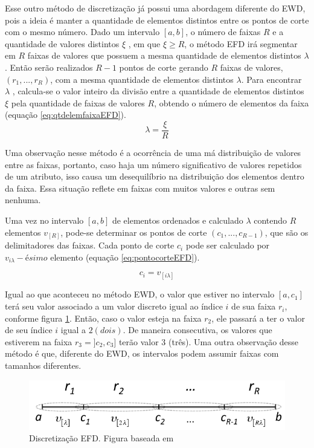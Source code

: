Esse outro método de discretização já possui uma abordagem diferente do EWD, pois a ideia é manter a quantidade de elementos distintos entre os pontos de corte com o mesmo número. Dado um intervalo ${[a,b]}$, o número de faixas ${R}$ e a quantidade de valores distintos ${\xi}$ , em que ${\xi \geqslant R}$, o método EFD irá segmentar em ${R}$ faixas de valores que possuem a mesma quantidade de elementos distintos ${\lambda}$. Então serão realizados ${R-1}$ pontos de corte gerando ${R}$ faixas de valores, ${(r_1,...,r_R)}$, com a mesma quantidade de elementos distintos ${\lambda}$. Para encontrar ${\lambda}$ , calcula-se o valor inteiro da divisão entre a quantidade de elementos distintos ${\xi}$ pela quantidade de faixas de valores ${R}$, obtendo o número de elementos da faixa (equação \ref{eq:qtdelemfaixaEFD}). 
\begin{equation}
\lambda = \frac{\xi}{R}
 \label{eq:qtdelemfaixaEFD}
\end{equation}

Uma observação nesse método é a ocorrência de uma má distribuição de valores entre as faixas, portanto, caso haja um número significativo de valores repetidos de um atributo, isso causa um desequilíbrio na distribuição dos elementos dentro da faixa. Essa situação reflete em faixas com muitos valores e outras sem nenhuma. 

Uma vez no intervalo ${[a,b]}$ de elementos ordenados e calculado ${\lambda}$ contendo ${R}$ elementos ${v_{[R]}}$,  pode-se determinar os pontos de corte ${(c_1,...,c_{R-1})}$, que são os delimitadores das faixas. Cada ponto de corte ${c_i}$ pode ser calculado por ${v_{i\lambda}-ésimo}$ elemento (equação \ref{eq:pontocorteEFD}).

\begin{equation}
c_i = v_{[i\lambda]}
 \label{eq:pontocorteEFD}
\end{equation}

Igual ao que aconteceu no método EWD, o valor que estiver no intervalo ${[a,c_1]}$ terá seu valor associado a um valor discreto igual ao índice ${i}$ de sua faixa ${r_i}$, conforme figura \ref{fig:faixasEFD}. Então, caso o valor esteja na faixa ${r_2}$, ele passará a ter o valor de seu índice ${i}$ igual a ${2(dois)}$. De maneira consecutiva, os valores que estiverem na faixa ${r_3=]c_2,c_3]}$ terão valor 3 (três). Uma outra observação desse método é que, diferente do EWD, os intervalos podem assumir faixas com tamanhos diferentes.

\begin{figure}[h]
        \centering
        \includegraphics[scale=0.6]{figs/discretizacaoEFD.png}
        \caption[Discretização EFD]{Discretização EFD. Figura baseada em \cite{Lopes2016}} 
        \label{fig:faixasEFD}
\end{figure} 

